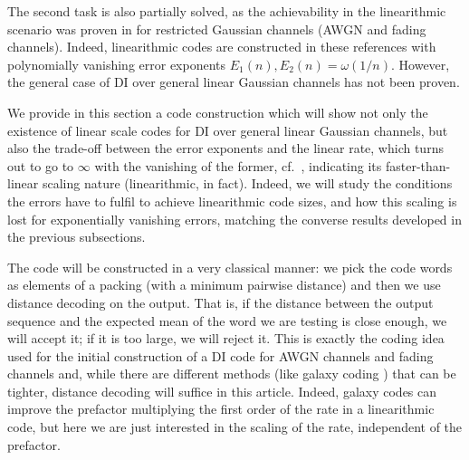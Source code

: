 \documentclass[10pt,conference]{IEEEtran}
\newcommand{\1}{\mathds{1}}
\begin{document}
The second task is also partially solved, as the achievability in the linearithmic scenario was proven in \cite{SPBD:DI_power,DI-fading} for restricted Gaussian channels (AWGN and fading channels). Indeed, linearithmic codes are constructed in these references with polynomially vanishing error exponents $E_1(n), E_2(n) = \omega(1/n)$. However, the general case of DI over general linear Gaussian channels has not been proven. 

We provide in this section a code construction which will show not only the existence of linear scale codes for DI over general linear Gaussian channels, but also the trade-off between the error exponents and the linear rate, which turns out to go to $\infty$ with the vanishing of the former, cf.~\cite{CDBW:Reliability-TCOM}, indicating its faster-than-linear scaling nature (linearithmic, in fact). Indeed, we will study the conditions the errors have to fulfil to achieve linearithmic code sizes, and how this scaling is lost for exponentially vanishing errors, matching the converse results developed in the previous subsections. 

The code will be constructed in a very classical manner: we pick the code words as elements of a packing (with a minimum pairwise distance) and then we use distance decoding on the output. That is, if the distance between the output sequence and the expected mean of the word we are testing is close enough, we will accept it; if it is too large, we will reject it. This is exactly the coding idea used for the initial construction of a DI code for AWGN channels \cite{SPBD:DI_power} and fading channels \cite{DI-fading} and, while there are different methods (like galaxy coding \cite{galaxy-codes}) that can be tighter, distance decoding will suffice in this article. Indeed, galaxy codes can improve the prefactor multiplying the first order of the rate in a linearithmic code, but here we are just interested in the scaling of the rate, independent of the prefactor.
\end{document}
